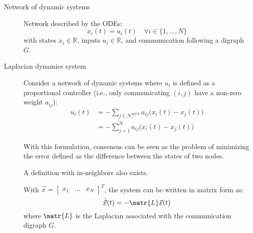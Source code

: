 \begin{description}
    \item[Network of dynamic systems] 
        Network described by the ODEs:
        \[ \dot{x}_i(t) = u_i(t) \quad \forall i \in \{ 1, \dots, N \} \]
        with states $x_i \in \mathbb{R}$, inputs $u_i \in \mathbb{R}$, and communication following a digraph $G$.

    \item[Laplacian dynamics system] 
        Consider a network of dynamic systems where $u_i$ is defined as a proportional controller (i.e., only communicating $(i, j)$ have a non-zero weight $a_{ij}$):
        \[ 
            \begin{split}
                u_i(t) 
                    &= - \sum_{j \in \mathcal{N}_i^\text{OUT}} a_{ij} \Big( x_i(t) - x_j(t) \Big) \\
                    &= - \sum_{j=1}^{N} a_{ij} \Big( x_i(t) - x_j(t) \Big) 
            \end{split}
        \]

        \begin{remark}
            With this formulation, consensus can be seen as the problem of minimizing the error defined as the difference between the states of two nodes.
        \end{remark}

        \begin{remark}
            A definition with in-neighbors also exists.
        \end{remark}


        \begin{theorem} \label{th:lti_continuous} 
            With $\vec{x} = \begin{bmatrix} x_1 & \dots & x_N \end{bmatrix}^T$, the system can be written in matrix form as:
            \[ \dot{\vec{x}}(t) = - \matr{L} \vec{x}(t) \]
            where $\matr{L}$ is the Laplacian associated with the communication digraph $G$.


\end{theorem}
\end{description}
